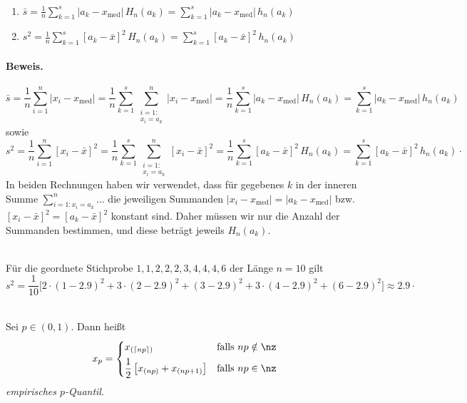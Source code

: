 \begin{satz}  \\
\begin{enumerate}[label=(\alph*)]
    \item $\displaystyle \bar s = \frac1n\sum_{k=1}^s |a_k-x_{\mathrm{med}}|\, H_n(a_k) = \sum_{k=1}^s |a_k-x_{\mathrm{med}}|\, h_n(a_k)$
    \item $\displaystyle s^2 = \frac1n\sum_{k=1}^s [a_k-\bar x]^2\, H_n(a_k) = \sum_{k=1}^s [a_k-\bar x]^2\, h_n(a_k)$
\end{enumerate}
    \paragraph{Beweis.}   \[
                              \bar s = \frac1n\sum_{i=1}^n |x_i-x_{\mathrm{med}}| = \frac1n\sum_{k=1}^s \sum_{\substack{i=1:\\ x_i=a_k}}^n |x_i-x_{\mathrm{med}}| = \frac1n\sum_{k=1}^s |a_k-x_{\mathrm{med}}|\,H_n(a_k) = \sum_{k=1}^s |a_k-x_{\mathrm{med}}|\,h_n(a_k)
\]
sowie
\[
    s^2 = \frac1n\sum_{i=1}^n [x_i-\bar x]^2 = \frac1n\sum_{k=1}^s \sum_{\substack{i=1:\\ x_i=a_k}}^n [x_i-\bar x]^2 = \frac1n\sum_{k=1}^s [a_k-\bar x]^2\,H_n(a_k) = \sum_{k=1}^s [a_k-\bar x]^2\,h_n(a_k) \cdot
\]
In beiden Rechnungen haben wir verwendet, dass für gegebenes $k$ in der inneren Summe $\sum_{i=1:x_i=a_k}^n \dots$ die jeweiligen Summanden $|x_i-x_{\mathrm{med}}|=|a_k-x_{\mathrm{med}}|$ bzw.\ $[x_i-\bar x]^2 = [a_k-\bar x]^2$ konstant sind.
Daher müssen wir nur die Anzahl der Summanden bestimmen, und diese beträgt jeweils $H_n(a_k)$.
\end{satz}

\begin{bsp}  \\
    Für die geordnete Stichprobe $1,1,2,2,2,3,4,4,4,6$ der Länge $n=10$ gilt
    \[
        s^2 = \frac{1}{10}\Big[2\cdot(1-2.9)^2 + 3\cdot(2-2.9)^2 + (3-2.9)^2 + 3\cdot(4-2.9)^2 + (6-2.9)^2\Big] \approx 2.9 \cdot
    \]
\end{bsp}

\begin{defi}  \\
    Sei $p\in(0,1)$.
    Dann heißt
    \[
        x_p =
        \begin{cases}
            x_{(\lceil np\rceil)} & \text{falls } np\notin\nz \\[1ex]
            \dfrac12\left[x_{(np)}+x_{(np+1)}\right] & \text{falls } np\in\nz
        \end{cases}
    \]
    \emph{empirisches $p$-Quantil}.
\end{defi}

